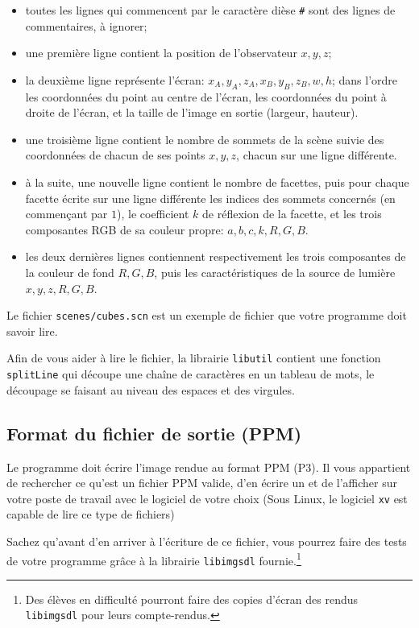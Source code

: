 \documentclass[10pt, a4paper ]{article}
\begin{document}
\begin{itemize}
    \item toutes les lignes qui commencent par le caractère dièse \texttt{\#}
        sont des lignes de commentaires, à ignorer;
    \item une première ligne contient la position de l'observateur $x,y,z$;
    \item la deuxième ligne représente l'écran: $x_A,y_A,z_A, x_B, y_B, z_B, w,
        h$; dans l'ordre les coordonnées du point au centre de l'écran, les
        coordonnées du point à droite de l'écran, et la taille de l'image en
        sortie (largeur, hauteur).
    \item une troisième ligne contient le nombre de sommets de la scène suivie
        des coordonnées de chacun de ses points $x,y,z$, chacun sur une ligne
        différente.
    \item à la suite, une nouvelle ligne contient le nombre de facettes, puis
        pour chaque facette écrite sur une ligne différente les indices des
        sommets concernés (en commençant par $1$), le coefficient $k$ de
        réflexion de la facette, et les trois composantes RGB de sa couleur
        propre: $a,b,c,k,R,G,B$.
    \item les deux dernières lignes contiennent respectivement les trois
        composantes de la couleur de fond $R,G,B$, puis les caractéristiques de
        la source de lumière $x,y,z,R,G,B$.
\end{itemize}

Le fichier \texttt{scenes/cubes.scn} est un exemple de fichier que votre
programme doit savoir lire.

Afin de vous aider à lire le fichier, la librairie \texttt{libutil} contient une
fonction \texttt{splitLine} qui découpe une chaîne de caractères
en un tableau de mots, le découpage se faisant au niveau des espaces et des
virgules.

\subsection{Format du fichier de sortie (PPM)}

Le programme doit écrire l'image rendue au format PPM (P3). Il vous appartient
de rechercher ce qu'est un fichier PPM valide, d'en écrire un et de l'afficher
sur votre poste de travail avec le logiciel de votre choix (Sous Linux, le
logiciel \texttt{xv} est capable de lire ce type de fichiers)

Sachez qu'avant d'en arriver à l'écriture de ce fichier, vous pourrez faire des
tests de votre programme grâce à la librairie \texttt{libimgsdl}
fournie.\footnote{Des élèves en difficulté pourront faire des copies d'écran des
    rendus \texttt{libimgsdl} pour leurs compte-rendus.}
\end{document}
